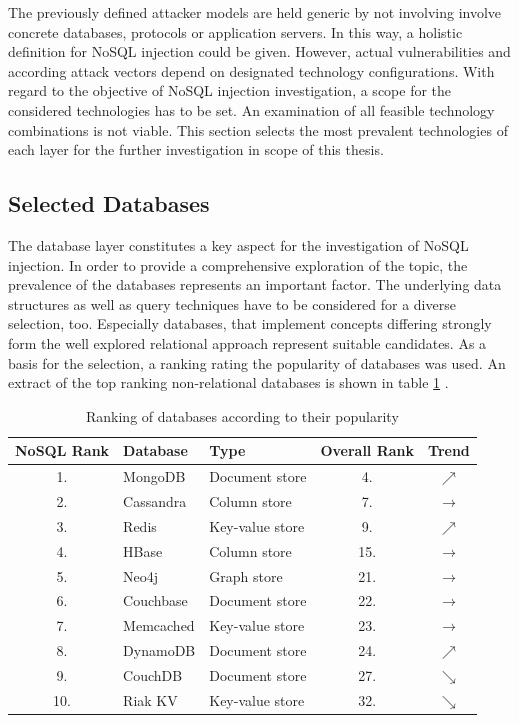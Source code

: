 The previously defined attacker models are held generic by not involving involve concrete databases, protocols or application servers. In this way, a holistic definition for NoSQL injection could be given. However, actual vulnerabilities and according attack vectors depend on designated technology configurations. With regard to the objective of NoSQL injection investigation, a scope for the considered technologies has to be set. An examination of all feasible technology combinations is not viable. This section selects the most prevalent technologies of each layer for the further investigation in scope of this thesis.

\subsection{Selected Databases}

The database layer constitutes a key aspect for the investigation of NoSQL injection. In order to provide a comprehensive exploration of the topic, the prevalence of the databases represents an important factor. The underlying data structures as well as query techniques have to be considered for a diverse selection, too. Especially databases, that implement concepts differing strongly form the well explored relational approach represent suitable candidates. As a basis for the selection, a ranking rating the popularity of databases was used. An extract of the top ranking non-relational databases is shown in table \ref{tab:db_ranking} \cite{Solid2016}.


\begin{table}[h]
 \sffamily 
 \centering
 \begin{tabular}{cllcc}
  \textbf{NoSQL Rank} & \textbf{Database} & \textbf{Type} & \textbf{Overall Rank} & \textbf{Trend} \\ \hline
  \rowcolor{light-gray} 1. &  MongoDB     & Document store & 4. & $\scriptstyle\nearrow$ \\
  2. &  Cassandra   & Column store & 7. & $\rightarrow$ \\
  \rowcolor{light-gray} 3. &  Redis       & Key-value store & 9. & $\scriptstyle\nearrow$ \\
  4. &  HBase       & Column store & 15. & $\rightarrow$ \\
  5. &  Neo4j       & Graph store & 21. & $\rightarrow$ \\
  6. &  Couchbase  & Document store & 22. & $\rightarrow$ \\
  \rowcolor{light-gray} 7. &  Memcached & Key-value store & 23. & $\rightarrow$ \\
  8. &  DynamoDB & Document store & 24. & $\scriptstyle\nearrow$ \\
  \rowcolor{light-gray} 9. &  CouchDB   & Document store & 27. & $\scriptstyle\searrow$ \\
  10. &  Riak KV & Key-value store & 32. & $\scriptstyle\searrow$ \\
  \bottomrule
 \end{tabular}
 \caption{Ranking of databases according to their popularity}
 \label{tab:db_ranking}
\end{table}

